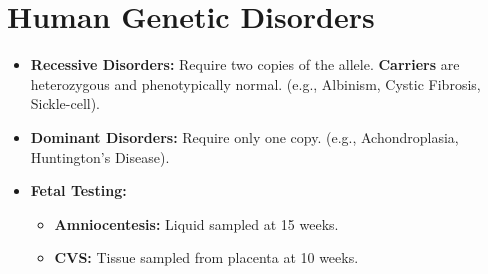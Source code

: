 \documentclass[11pt, a4paper]{article}
\begin{document}
\section*{Human Genetic Disorders}
\begin{itemize}
    \item \textbf{Recessive Disorders:} Require two copies of the allele. \textbf{Carriers} are heterozygous and phenotypically normal. (e.g., Albinism, Cystic Fibrosis, Sickle-cell).
    \item \textbf{Dominant Disorders:} Require only one copy. (e.g., Achondroplasia, Huntington’s Disease).
    \item \textbf{Fetal Testing:} 
    \begin{itemize}
        \item \textbf{Amniocentesis:} Liquid sampled at 15 weeks.
        \item \textbf{CVS:} Tissue sampled from placenta at 10 weeks.
    \end{itemize}
\end{itemize}
\end{document}
